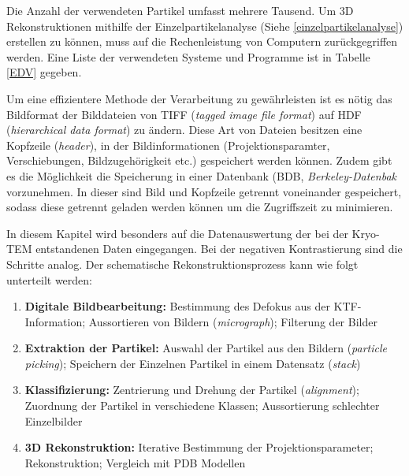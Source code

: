 Die Anzahl der verwendeten Partikel umfasst mehrere Tausend.
Um 3D Rekonstruktionen mithilfe der Einzelpartikelanalyse (Siehe \ref{einzelpartikelanalyse}) erstellen zu können, muss auf die Rechenleistung von Computern zurückgegriffen werden.
Eine Liste der verwendeten Systeme und Programme ist in Tabelle \ref{EDV} gegeben.

Um eine effizientere Methode der Verarbeitung zu gewährleisten ist es nötig das Bildformat der Bilddateien von TIFF (\textit{tagged image file format}) auf HDF (\textit{hierarchical data format}) zu ändern.
Diese Art von Dateien besitzen eine Kopfzeile (\textit{header}), in der Bildinformationen (Projektionsparamter, Verschiebungen, Bildzugehörigkeit etc.) gespeichert werden können.
Zudem gibt es die Möglichkeit die Speicherung in einer Datenbank (BDB, \textit{Berkeley-Datenbak} vorzunehmen.
In dieser sind Bild und Kopfzeile getrennt voneinander gespeichert, sodass diese getrennt geladen werden können um die Zugriffszeit zu minimieren.

In diesem Kapitel wird besonders auf die Datenauswertung der bei der Kryo-TEM entstandenen Daten eingegangen.
Bei der negativen Kontrastierung sind die Schritte analog. 
Der schematische Rekonstruktionsprozess kann wie folgt unterteilt werden:

\begin{enumerate}
	\item \textbf{Digitale Bildbearbeitung:} Bestimmung des Defokus aus der KTF-Information; Aussortieren von Bildern (\textit{micrograph}); Filterung der Bilder
	\item \textbf{Extraktion der Partikel:} Auswahl der Partikel aus den Bildern (\textit{particle picking}); Speichern der Einzelnen Partikel in einem Datensatz (\textit{stack})
	\item \textbf{Klassifizierung:} Zentrierung und Drehung der Partikel (\textit{alignment}); Zuordnung der Partikel in verschiedene Klassen; Aussortierung schlechter Einzelbilder
	\item \textbf{3D Rekonstruktion:} Iterative Bestimmung der Projektionsparameter; Rekonstruktion; Vergleich mit PDB Modellen
\end{enumerate}

